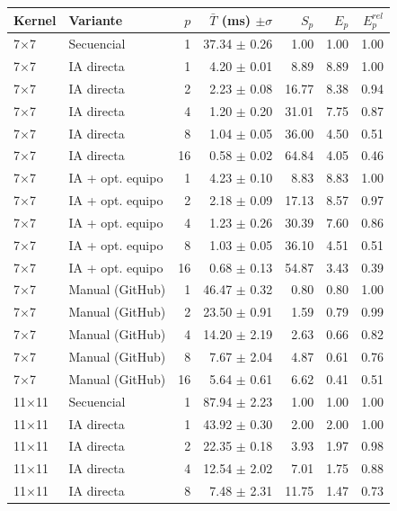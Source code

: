 \begin{tabular}{llrrrrr}
\toprule
Kernel & Variante & $p$ & $\bar{T}$ (ms) $\pm\sigma$ & $S_p$ & $E_p$ & $E^{rel}_p$ \\
\midrule
7$\times$7 & Secuencial & 1 & 37.34 $\pm$ 0.26 & 1.00 & 1.00 & 1.00 \\
7$\times$7 & IA directa & 1 & 4.20 $\pm$ 0.01 & 8.89 & 8.89 & 1.00 \\
7$\times$7 & IA directa & 2 & 2.23 $\pm$ 0.08 & 16.77 & 8.38 & 0.94 \\
7$\times$7 & IA directa & 4 & 1.20 $\pm$ 0.20 & 31.01 & 7.75 & 0.87 \\
7$\times$7 & IA directa & 8 & 1.04 $\pm$ 0.05 & 36.00 & 4.50 & 0.51 \\
7$\times$7 & IA directa & 16 & 0.58 $\pm$ 0.02 & 64.84 & 4.05 & 0.46 \\
7$\times$7 & IA + opt. equipo & 1 & 4.23 $\pm$ 0.10 & 8.83 & 8.83 & 1.00 \\
7$\times$7 & IA + opt. equipo & 2 & 2.18 $\pm$ 0.09 & 17.13 & 8.57 & 0.97 \\
7$\times$7 & IA + opt. equipo & 4 & 1.23 $\pm$ 0.26 & 30.39 & 7.60 & 0.86 \\
7$\times$7 & IA + opt. equipo & 8 & 1.03 $\pm$ 0.05 & 36.10 & 4.51 & 0.51 \\
7$\times$7 & IA + opt. equipo & 16 & 0.68 $\pm$ 0.13 & 54.87 & 3.43 & 0.39 \\
7$\times$7 & Manual (GitHub) & 1 & 46.47 $\pm$ 0.32 & 0.80 & 0.80 & 1.00 \\
7$\times$7 & Manual (GitHub) & 2 & 23.50 $\pm$ 0.91 & 1.59 & 0.79 & 0.99 \\
7$\times$7 & Manual (GitHub) & 4 & 14.20 $\pm$ 2.19 & 2.63 & 0.66 & 0.82 \\
7$\times$7 & Manual (GitHub) & 8 & 7.67 $\pm$ 2.04 & 4.87 & 0.61 & 0.76 \\
7$\times$7 & Manual (GitHub) & 16 & 5.64 $\pm$ 0.61 & 6.62 & 0.41 & 0.51 \\
\midrule
11$\times$11 & Secuencial & 1 & 87.94 $\pm$ 2.23 & 1.00 & 1.00 & 1.00 \\
11$\times$11 & IA directa & 1 & 43.92 $\pm$ 0.30 & 2.00 & 2.00 & 1.00 \\
11$\times$11 & IA directa & 2 & 22.35 $\pm$ 0.18 & 3.93 & 1.97 & 0.98 \\
11$\times$11 & IA directa & 4 & 12.54 $\pm$ 2.02 & 7.01 & 1.75 & 0.88 \\
11$\times$11 & IA directa & 8 & 7.48 $\pm$ 2.31 & 11.75 & 1.47 & 0.73 \\

\end{tabular}
